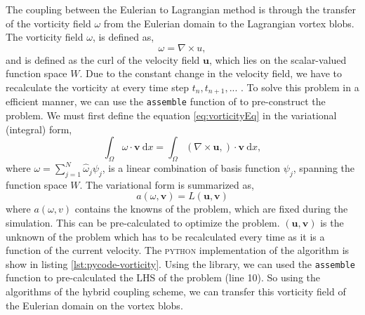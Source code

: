 The coupling between the Eulerian to Lagrangian method is through the transfer of the vorticity field $\omega$ from the Eulerian domain to the Lagrangian vortex blobs. The vorticity field $\omega$, is defined as,
	\begin{equation}
	\omega = \nabla \times u,
	\label{eq:vorticityEq}
	\end{equation}
and is defined as the curl of the velocity field $\mathbf{u}$, which lies on the scalar-valued function space $W$. Due to the constant change in the velocity field, we have to recalculate the vorticity at every time step $t_n, t_{n+1}, ...$ . To solve this problem in a efficient manner, we can use the \texttt{assemble} function of \dolfin to pre-construct the problem. We must first define the equation \ref{eq:vorticityEq} in the variational (integral) form,  
	\begin{equation}
	\int_{\Omega} \omega \cdot \mathbf{v}\ \mathrm{d}x = \int_{\Omega} (\nabla \times \mathbf{u},) \cdot \mathbf{v}\ \mathrm{d}x,
	\end{equation}
where $\omega = \sum_{j=1}^N \hat{\omega}_j\psi_j$, is a linear combination of basis function $\psi_j$, spanning the function space $W$. The variational form is summarized as,
	\begin{equation}
	a(\omega,\mathbf{v}) = L(\mathbf{u},\mathbf{v})
	\end{equation}
where $a(\omega,v)$ contains the knowns of the problem, which are fixed during the simulation. This can be pre-calculated to optimize the problem. $(\mathbf{u},\mathbf{v})$ is the unknown of the problem which has to be recalculated every time as it is a function of the current velocity. The \textsc{python} implementation of the algorithm is show in listing \ref{lst:pycode-vorticity}. Using the \dolfin library, we can used the \texttt{assemble} function to pre-calculated the LHS of the problem (line 10). So using the algorithms of the hybrid coupling scheme, we can transfer this vorticity field of the Eulerian domain on the vortex blobs.

